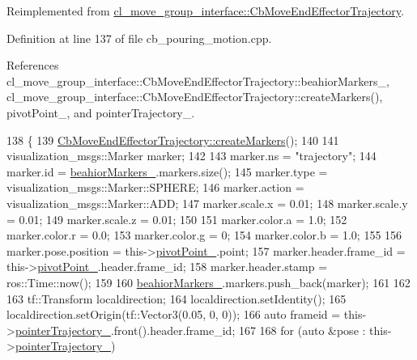 Reimplemented from \hyperlink{classcl__move__group__interface_1_1CbMoveEndEffectorTrajectory_a442efa1d5bc9e9a16f74ecd31b13d9b5}{cl\+\_\+move\+\_\+group\+\_\+interface\+::\+Cb\+Move\+End\+Effector\+Trajectory}.



Definition at line 137 of file cb\+\_\+pouring\+\_\+motion.\+cpp.



References cl\+\_\+move\+\_\+group\+\_\+interface\+::\+Cb\+Move\+End\+Effector\+Trajectory\+::beahior\+Markers\+\_\+, cl\+\_\+move\+\_\+group\+\_\+interface\+::\+Cb\+Move\+End\+Effector\+Trajectory\+::create\+Markers(), pivot\+Point\+\_\+, and pointer\+Trajectory\+\_\+.


\begin{DoxyCode}
138     \{
139         \hyperlink{classcl__move__group__interface_1_1CbMoveEndEffectorTrajectory_a442efa1d5bc9e9a16f74ecd31b13d9b5}{CbMoveEndEffectorTrajectory::createMarkers}();
140 
141         visualization\_msgs::Marker marker;
142 
143         marker.ns = \textcolor{stringliteral}{"trajectory"};
144         marker.id = \hyperlink{classcl__move__group__interface_1_1CbMoveEndEffectorTrajectory_a809fb5385adf27c0a1c8f8136566949c}{beahiorMarkers\_}.markers.size();
145         marker.type = visualization\_msgs::Marker::SPHERE;
146         marker.action = visualization\_msgs::Marker::ADD;
147         marker.scale.x = 0.01;
148         marker.scale.y = 0.01;
149         marker.scale.z = 0.01;
150 
151         marker.color.a = 1.0;
152         marker.color.r = 0.0;
153         marker.color.g = 0;
154         marker.color.b = 1.0;
155 
156         marker.pose.position = this->\hyperlink{classcl__move__group__interface_1_1CbCircularPouringMotion_a4c100d8ba3e57f7ddfb614017d115fca}{pivotPoint\_}.point;
157         marker.header.frame\_id = this->\hyperlink{classcl__move__group__interface_1_1CbCircularPouringMotion_a4c100d8ba3e57f7ddfb614017d115fca}{pivotPoint\_}.header.frame\_id;
158         marker.header.stamp = ros::Time::now();
159 
160         \hyperlink{classcl__move__group__interface_1_1CbMoveEndEffectorTrajectory_a809fb5385adf27c0a1c8f8136566949c}{beahiorMarkers\_}.markers.push\_back(marker);
161 
162 
163         tf::Transform localdirection;
164         localdirection.setIdentity();
165         localdirection.setOrigin(tf::Vector3(0.05, 0, 0));
166         \textcolor{keyword}{auto} frameid = this->\hyperlink{classcl__move__group__interface_1_1CbCircularPouringMotion_a6f53442c47cf9280d8be72ea1c35546f}{pointerTrajectory\_}.front().header.frame\_id;
167 
168         \textcolor{keywordflow}{for} (\textcolor{keyword}{auto} &pose : this->\hyperlink{classcl__move__group__interface_1_1CbCircularPouringMotion_a6f53442c47cf9280d8be72ea1c35546f}{pointerTrajectory\_})

\end{DoxyCode}
